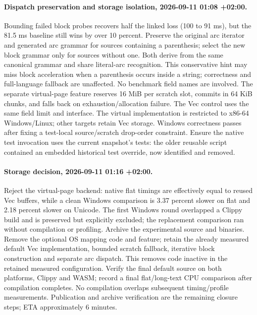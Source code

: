 \documentclass[11pt,a4paper]{article}
\begin{document}
\paragraph{Dispatch preservation and storage isolation, 2026-09-11 01:08 +02:00.}
Bounding failed block probes recovers half the linked loss (100 to 91 ms), but
the 81.5 ms baseline still wins by over 10 percent. Preserve the original arc
iterator and generated arc grammar for sources containing a parenthesis; select
the new block grammar only for sources without one. Both derive from the same
canonical grammar and share literal-arc recognition. This conservative hint may
miss block acceleration when a parenthesis occurs inside a string; correctness
and full-language fallback are unaffected. No benchmark field names are involved.
The separate virtual-page feature reserves 16 MiB per scratch slot, commits in
64 KiB chunks, and falls back on exhaustion/allocation failure. The Vec control
uses the same field limit and interface. The virtual implementation is restricted
to x86-64 Windows/Linux; other targets retain Vec storage. Windows correctness
passes after fixing a test-local source/scratch drop-order constraint. Ensure the
native test invocation uses the current snapshot's tests: the older reusable
script contained an embedded historical test override, now identified and removed.

\paragraph{Storage decision, 2026-09-11 01:16 +02:00.}
Reject the virtual-page backend: native flat timings are effectively equal to
reused Vec buffers, while a clean Windows comparison is 3.37 percent slower on
flat and 2.18 percent slower on Unicode. The first Windows round overlapped a
Clippy build and is preserved but explicitly excluded; the replacement comparison
ran without compilation or profiling. Archive the experimental source and binaries.
Remove the optional OS mapping code and feature; retain the already measured
default Vec implementation, bounded scratch fallback, iterative block construction
and separate arc dispatch. This removes code inactive in the retained measured
configuration. Verify the final default source on both platforms, Clippy and WASM;
record a final flat/long-text CPU comparison after compilation completes. No
compilation overlaps subsequent timing/profile measurements. Publication and
archive verification are the remaining closure steps; ETA approximately 6 minutes.
\end{document}
